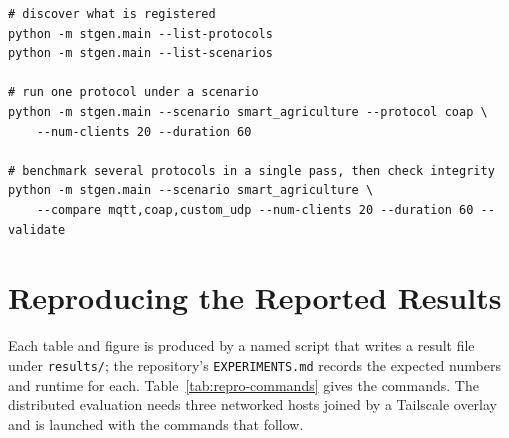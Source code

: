 \documentclass[jsan,article,submit,moreauthors,pdftex]{Definitions/mdpi}
\begin{document}
\begin{lstlisting}[frame=single, basicstyle=\footnotesize\ttfamily, framesep=4pt, breaklines=true]
# discover what is registered
python -m stgen.main --list-protocols
python -m stgen.main --list-scenarios

# run one protocol under a scenario
python -m stgen.main --scenario smart_agriculture --protocol coap \
    --num-clients 20 --duration 60

# benchmark several protocols in a single pass, then check integrity
python -m stgen.main --scenario smart_agriculture \
    --compare mqtt,coap,custom_udp --num-clients 20 --duration 60 --validate
\end{lstlisting}


\section{Reproducing the Reported Results}
\label{app:reproduce}

Each table and figure is produced by a named script that writes a result file under \texttt{results/}; the repository's \texttt{EXPERIMENTS.md} records the expected numbers and runtime for each. Table~\ref{tab:repro-commands} gives the commands. The distributed evaluation needs three networked hosts joined by a Tailscale overlay and is launched with the commands that follow.
\end{document}
